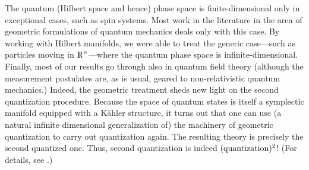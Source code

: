 \documentclass[12pt,aps,eqsecnum,tighten]{revtex4-2}
\def\Rl{{\mathchoice 
{\setbox0=\hbox{$\displaystyle\rm R$}\hbox{\hbox to0pt
{\kern0.4\wd0\vrule height0.9\ht0\hss}\box0}}
{\setbox0=\hbox{$\textstyle\rm R$}\hbox{\hbox to0pt
{\kern0.4\wd0\vrule height0.9\ht0\hss}\box0}}
{\setbox0=\hbox{$\scriptstyle\rm R$}\hbox{\hbox to0pt
{\kern0.4\wd0\vrule height0.9\ht0\hss}\box0}}
{\setbox0=\hbox{$\scriptscriptstyle\rm R$}\hbox{\hbox to0pt
{\kern0.4\wd0\vrule height0.9\ht0\hss}\box0}}}}
\def\Rl{{\mathchoice
{\setbox0=\hbox{$\displaystyle\rm R$}\hbox{\hbox to0pt
{\kern0.4\wd0\vrule height0.9\ht0\hss}\box0}}
{\setbox0=\hbox{$\textstyle\rm R$}\hbox{\hbox to0pt
{\kern0.4\wd0\vrule height0.9\ht0\hss}\box0}}
{\setbox0=\hbox{$\scriptstyle\rm R$}\hbox{\hbox to0pt
{\kern0.4\wd0\vrule height0.9\ht0\hss}\box0}}
{\setbox0=\hbox{$\scriptscriptstyle\rm R$}\hbox{\hbox to0pt
{\kern0.4\wd0\vrule height0.9\ht0\hss}\box0}}}}
\def\R{\Rl}
\begin{document}
The quantum (Hilbert space and hence) phase space is
finite-dimensional only in exceptional cases, such as spin
systems. Most work in the literature in the area of geometric
formulations of quantum mechanics deals only with this case.  By
working with Hilbert manifolds, we were able to treat the generic
case---such as particles moving in $\R^n$---where the quantum phase
space is infinite-dimensional. Finally, most of our results go through
also in quantum field theory (although the measurement postulates are,
as is usual, geared to non-relativistic quantum mechanics.) Indeed,
the geometric treatment sheds new light on the second quantization
procedure. Because the space of quantum states is itself a symplectic
manifold equipped with a K\"ahler structure, it turns out that one can
use (a natural infinite dimensional generalization of) the machinery
of geometric quantization to carry out quantization again. The
resulting theory is precisely the second quantized one. Thus, second
quantization is indeed $({\rm quantization})^2$!  (For details, see
\cite{thesis}.)
\end{document}
